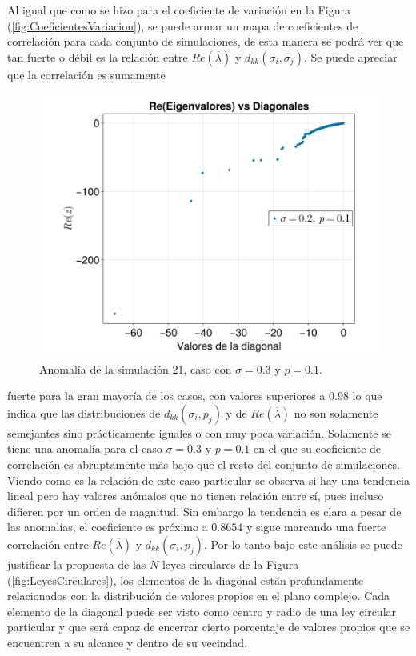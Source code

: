 Al igual que como se hizo para el coeficiente de variación en la Figura (\ref{fig:CoeficientesVariacion}), se puede armar un mapa de coeficientes de correlación para cada conjunto de simulaciones, de esta manera se podrá ver que tan fuerte o débil es la relación entre $Re(\overline{\lambda})$ y $d_{kk}(\sigma_i,\sigma_j)$. Se puede apreciar que la correlación es sumamente 
\begin{figure} \vspace{-30pt} \begin{center}
		\includegraphics[scale=0.135]{../Imagenes/AnomaliaSim21}
	\end{center}
	\vspace{-20pt} 
	\caption{Anomalía de la simulación 21, caso con $\sigma=0.3$ y $p=0.1$.}
	\vspace{-10pt}
	\label{fig:AnomaliaSim21}
\end{figure}
fuerte para la gran mayoría de los casos, con valores superiores a $0.98$ lo que indica que las distribuciones de $d_{kk}(\sigma_i,p_j)$ y de $Re(\overline{\lambda})$ no son solamente semejantes sino prácticamente iguales o con muy poca variación. Solamente se tiene una anomalía para el caso $\sigma=0.3$ y $p=0.1$ en el que su coeficiente de correlación es abruptamente más bajo que el resto del conjunto de simulaciones. Viendo como es la relación de este caso particular se observa si hay una tendencia lineal pero hay valores anómalos que no tienen relación entre sí, pues incluso difieren por un orden de magnitud. Sin embargo la tendencia es clara a pesar de las anomalías, el coeficiente es próximo a $0.8654$ y sigue marcando una fuerte correlación entre $Re(\overline{\lambda})$ y $d_{kk}(\sigma_i,p_j)$. Por lo tanto bajo este análisis se puede justificar la propuesta de las $N$ leyes circulares de la Figura (\ref{fig:LeyesCirculares}), los elementos de la diagonal están profundamente relacionados con la distribución de valores propios en el plano complejo. Cada elemento de la diagonal puede ser visto como centro y radio de una ley circular particular y que será capaz de encerrar cierto porcentaje de valores propios que se encuentren a su alcance y dentro de su vecindad.\\
